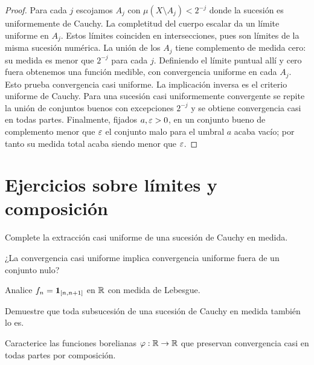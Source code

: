 \begin{proof}
Para cada $j$ escojamos $A_j$ con $\mu(X\setminus A_j)<2^{-j}$ donde la sucesión es uniformemente de Cauchy. La completitud del cuerpo escalar da un límite uniforme en $A_j$. Estos límites coinciden en intersecciones, pues son límites de la misma sucesión numérica. La unión de los $A_j$ tiene complemento de medida cero: su medida es menor que $2^{-j}$ para cada $j$. Definiendo el límite puntual allí y cero fuera obtenemos una función medible, con convergencia uniforme en cada $A_j$. Esto prueba convergencia casi uniforme. La implicación inversa es el criterio uniforme de Cauchy. Para una sucesión casi uniformemente convergente se repite la unión de conjuntos buenos con excepciones $2^{-j}$ y se obtiene convergencia casi en todas partes. Finalmente, fijados $a,\varepsilon>0$, en un conjunto bueno de complemento menor que $\varepsilon$ el conjunto malo para el umbral $a$ acaba vacío; por tanto su medida total acaba siendo menor que $\varepsilon$.
\end{proof}

\section{Ejercicios sobre límites y composición}
\begin{ejercicio}\label{ej:v2-l15-1}
Complete la extracción casi uniforme de una sucesión de Cauchy en medida.
\end{ejercicio}

\begin{ejercicio}\label{ej:v2-l15-2}
¿La convergencia casi uniforme implica convergencia uniforme fuera de un conjunto nulo?
\end{ejercicio}

\begin{ejercicio}\label{ej:v2-l15-3}
Analice $f_n=\mathbf1_{[n,n+1]}$ en $\mathbb R$ con medida de Lebesgue.
\end{ejercicio}

\begin{ejercicio}\label{ej:v2-l15-4}
Demuestre que toda subsucesión de una sucesión de Cauchy en medida también lo es.
\end{ejercicio}

\begin{ejercicio}\label{ej:v2-l15-5}
Caracterice las funciones borelianas $\varphi:\mathbb R\to\mathbb R$ que preservan convergencia casi en todas partes por composición.
\end{ejercicio}

